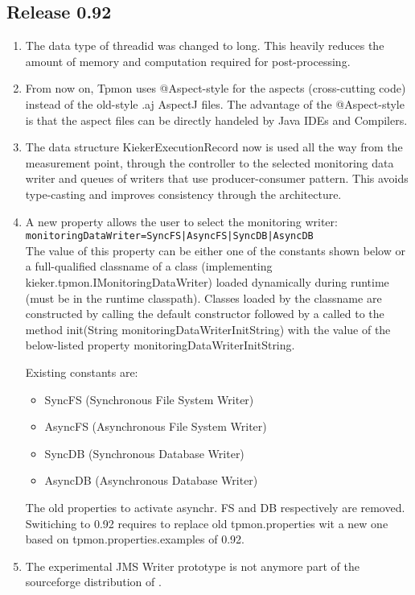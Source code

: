 \documentclass{scrartcl}
\begin{document}
\subsection{Release 0.92}
\begin{enumerate}
\item The data type of threadid was changed to long. This heavily reduces the amount of memory and computation required for post-processing.
\item From now on, Tpmon uses  @Aspect-style for the aspects (cross-cutting code) instead of the old-style
    .aj AspectJ files. The advantage of the @Aspect-style is that the aspect files can be directly handeled by Java IDEs and Compilers.
\item The data structure KiekerExecutionRecord now is used all the way from the measurement point, through the controller to the selected monitoring data writer and queues of writers that use producer-consumer pattern. This avoids type-casting and improves consistency through the architecture.
\item  A new property allows the user to select the monitoring writer: \\
    \verb.monitoringDataWriter=SyncFS|AsyncFS|SyncDB|AsyncDB. \\
The value of this property can be either one of the constants shown below or a full-qualified
classname of a class (implementing kieker.tpmon.IMonitoringDataWriter) loaded
dynamically during runtime (must be in the runtime classpath). Classes loaded by
the classname are constructed by calling the default constructor followed by a
called to the method init(String monitoringDataWriterInitString) with the
value of the below-listed property monitoringDataWriterInitString.

Existing constants are:
\begin{itemize}
\item SyncFS (Synchronous File System Writer)
\item AsyncFS (Asynchronous File System Writer)
\item SyncDB (Synchronous Database Writer)
\item AsyncDB (Asynchronous Database Writer)
\end{itemize}
The old properties to activate asynchr. FS and DB respectively are removed. Switiching to
\tpmon{} 0.92 requires to replace old tpmon.properties wit a new one based on tpmon.properties.examples of 0.92.

\item The experimental JMS Writer prototype is not anymore part of the sourceforge distribution of \tpmon{}.
\end{enumerate}
\end{document}
